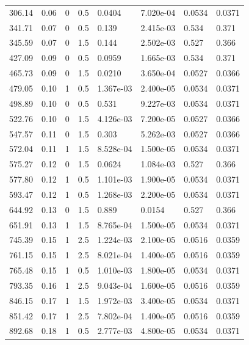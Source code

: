 \documentclass[preview]{standalone}
\begin{document}
{{\begin{tabular}{L{1.2cm}C{1.2cm} C{0.3cm}C{0.5cm} C{1.4cm}C{1.4cm} C{1.4cm}C{1.4cm}}
  306.14  &  0.06  & 0     & 0.5 &  0.0404  & 7.020e-04  & 0.0534 &  0.0371   \\ 
  341.71  &  0.07  & 0     & 0.5 &  0.139  & 2.415e-03  & 0.534 &  0.371   \\ 
  345.59  &  0.07  & 0     & 1.5 &  0.144  & 2.502e-03  & 0.527 &  0.366   \\ 
  427.09  &  0.09  & 0     & 0.5 &  0.0959  & 1.665e-03  & 0.534 &  0.371   \\ 
  465.73  &  0.09  & 0     & 1.5 &  0.0210  & 3.650e-04  & 0.0527 &  0.0366   \\ 
  479.05  &  0.10  & 1     & 0.5 &  1.367e-03  & 2.400e-05  & 0.0534 &  0.0371   \\ 
  498.89  &  0.10  & 0     & 0.5 &  0.531  & 9.227e-03  & 0.0534 &  0.0371   \\ 
  522.76  &  0.10  & 0     & 1.5 &  4.126e-03  & 7.200e-05  & 0.0527 &  0.0366   \\ 
  547.57  &  0.11  & 0     & 1.5 &  0.303  & 5.262e-03  & 0.0527 &  0.0366   \\ 
  572.04  &  0.11  & 1     & 1.5 &  8.528e-04  & 1.500e-05  & 0.0534 &  0.0371   \\ 
  575.27  &  0.12  & 0     & 1.5 &  0.0624  & 1.084e-03  & 0.527 &  0.366   \\ 
  577.80  &  0.12  & 1     & 0.5 &  1.101e-03  & 1.900e-05  & 0.0534 &  0.0371   \\ 
  593.47  &  0.12  & 1     & 0.5 &  1.268e-03  & 2.200e-05  & 0.0534 &  0.0371   \\ 
  644.92  &  0.13  & 0     & 1.5 &  0.889  & 0.0154  & 0.527 &  0.366   \\ 
  651.91  &  0.13  & 1     & 1.5 &  8.765e-04  & 1.500e-05  & 0.0534 &  0.0371   \\ 
  745.39  &  0.15  & 1     & 2.5 &  1.224e-03  & 2.100e-05  & 0.0516 &  0.0359   \\ 
  761.15  &  0.15  & 1     & 2.5 &  8.021e-04  & 1.400e-05  & 0.0516 &  0.0359   \\ 
  765.48  &  0.15  & 1     & 0.5 &  1.010e-03  & 1.800e-05  & 0.0534 &  0.0371   \\ 
  793.35  &  0.16  & 1     & 2.5 &  9.043e-04  & 1.600e-05  & 0.0516 &  0.0359   \\ 
  846.15  &  0.17  & 1     & 1.5 &  1.972e-03  & 3.400e-05  & 0.0534 &  0.0371   \\ 
  851.42  &  0.17  & 1     & 2.5 &  7.802e-04  & 1.400e-05  & 0.0516 &  0.0359   \\ 
  892.68  &  0.18  & 1     & 0.5 &  2.777e-03  & 4.800e-05  & 0.0534 &  0.0371   \\ 

\end{tabular}}}
\end{document}

